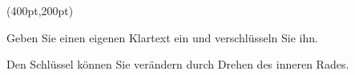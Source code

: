 

\PapierGroesse(400pt,200pt)



\parskip=5pt
Geben Sie einen eigenen Klartext ein und verschlüsseln Sie ihn.

Den Schlüssel können Sie verändern durch Drehen des inneren Rades.

